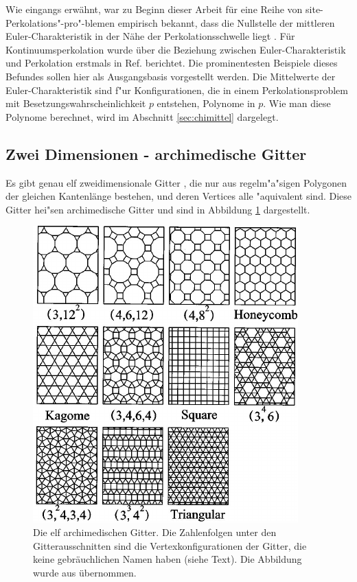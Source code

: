 Wie eingangs erw\"ahnt, war zu Beginn dieser Arbeit f\"ur eine Reihe von site-Perkolations"-pro"-blemen empirisch bekannt, dass die Nullstelle der mittleren Euler-Charakteristik in der N\"ahe der Perkolationsschwelle liegt \cite{Wagner:02}. F\"ur Kontinuumsperkolation wurde \"uber die Beziehung zwischen Euler-Charakteristik und Perkolation erstmals in Ref. \cite{Mecke:91} berichtet. Die prominentesten Beispiele dieses Befundes sollen hier als Ausgangsbasis vorgestellt werden. Die Mittelwerte der Euler-Charakteristik sind f"ur Konfigurationen, die in einem Perkolationsproblem mit Besetzungswahrscheinlichkeit $p$ entstehen, Polynome in $p$. Wie man diese Polynome berechnet, wird im Abschnitt \ref{sec:chimittel} dargelegt. 

\subsection{Zwei Dimensionen - archimedische Gitter}
\label{sec:archilattices}
Es gibt genau elf zweidimensionale Gitter \cite{Gruenbaum:86}, die nur aus regelm"a"sigen Polygonen der gleichen Kantenl\"ange bestehen, und deren Vertices alle "aquivalent sind. Diese Gitter hei"sen archimedische Gitter und sind in Abbildung \ref{fig:archimed} dargestellt.
\begin{figure}[tbp]
  \centering
  \includegraphics{./Einleitung-figs/archimed}
  \caption{Die elf archimedischen Gitter. Die Zahlenfolgen unter den Gitterausschnitten sind die Vertexkonfigurationen der Gitter, die keine gebr\"auchlichen Namen haben (siehe Text). Die Abbildung wurde aus \cite{Suding:99} \"ubernommen.}
  \label{fig:archimed}
\end{figure}
